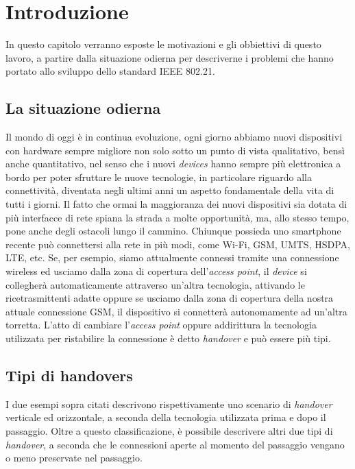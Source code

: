 \chapter{Introduzione}
In questo capitolo verranno esposte le motivazioni e gli obbiettivi di questo lavoro, a partire dalla situazione odierna per descriverne i problemi che hanno portato allo sviluppo dello standard IEEE 802.21.

\section{La situazione odierna}
Il mondo di oggi è in continua evoluzione, ogni giorno abbiamo nuovi dispositivi con hardware sempre migliore non solo sotto un punto di vista qualitativo, bensì anche quantitativo, nel senso che i nuovi {\em devices} hanno sempre più elettronica a bordo per poter sfruttare le nuove tecnologie, in particolare riguardo alla connettività, diventata negli ultimi anni un aspetto fondamentale della vita di tutti i giorni. Il fatto che ormai la maggioranza dei nuovi dispositivi sia dotata di più interfacce di rete spiana la strada a molte opportunità, ma, allo stesso tempo, pone anche degli ostacoli lungo il cammino.
Chiunque possieda uno smartphone recente può connettersi alla rete in più modi, come Wi-Fi, GSM, UMTS, HSDPA, LTE, etc. Se, per esempio, siamo attualmente connessi tramite una connessione wireless ed usciamo dalla zona di copertura dell'{\em access point}, il {\em device} si collegherà automaticamente attraverso un'altra tecnologia, attivando le ricetrasmittenti adatte oppure se usciamo dalla zona di copertura della nostra attuale connessione GSM, il dispositivo si connetterà autonomamente ad un'altra torretta. L'atto di cambiare l'{\em access point} oppure addirittura la tecnologia utilizzata per ristabilire la connessione è detto {\em handover} e può essere più tipi.

\section{Tipi di handovers}
I due esempi sopra citati descrivono rispettivamente uno scenario di {\em handover} verticale ed orizzontale, a seconda della tecnologia utilizzata prima e dopo il passaggio. Oltre a questo classificazione, è possibile descrivere altri due tipi di {\em handover}, a seconda che le connessioni aperte al momento del passaggio vengano o meno preservate nel passaggio.

